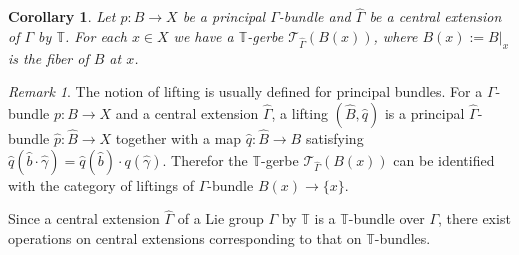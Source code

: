 \documentclass[a4paper,a4paper]{article}
\newtheorem{cor}[thm]{Corollary}
\theoremstyle{definition}
\theoremstyle{remark}
\newtheorem*{rem}{Remark}
\newcommand{\T}{\mathbb{T}}
\newcommand{\sT}{\mathcal{T}}
\newcommand{\hq}{\widehat{q}}
\def\h#1{ \widehat{#1} }
\begin{document}
\begin{cor} \label{cor_gerbe_bundle}
Let $p : B \to X$ be a principal $\Gamma$-bundle and $\h{\Gamma}$ be a central extension of $\Gamma$ by $\T$. For each $x \in X$ we have a $\T$-gerbe $\sT_{\h{\Gamma}}(B(x))$, where $B(x) := B|_x$ is the fiber of $B$ at $x$.
\end{cor}

\begin{rem}
The notion of lifting is usually defined for principal bundles. For a $\Gamma$-bundle $p : B \to X$ and a central extension $\h{\Gamma}$, a lifting $(\h{B}, \h{q})$ is a principal $\h{\Gamma}$-bundle $\h{p} : \h{B} \to X$ together with a map $\hq : \h{B} \to B$ satisfying $\hq(\h{b} \cdot \h{\gamma}) = \hq(\h{b}) \cdot q(\h{\gamma})$. Therefor the $\T$-gerbe $\sT_{\h{\Gamma}}(B(x))$ can be identified with the category of liftings of $\Gamma$-bundle $B(x) \to \{ x \}$.
\end{rem}

Since a central extension $\h{\Gamma}$ of a Lie group $\Gamma$ by $\T$ is a $\T$-bundle over $\Gamma$, there exist operations on central extensions corresponding to that on $\T$-bundles.
\end{document}

